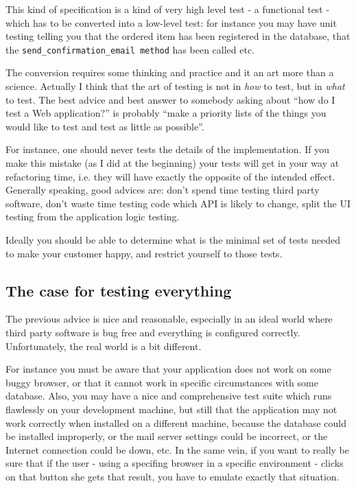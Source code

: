 \documentclass[10pt,a4paper,english]{article}
\begin{document}
This kind of specification is a kind of very high level test - a 
functional test - which has to be converted into a low-level test: 
for instance you may have unit testing telling you that the ordered 
item has been registered in the database, that the 
\texttt{send{\_}confirmation{\_}email method} has been called etc.

The conversion requires some thinking and practice and it an art more
than a science. Actually I think that the art of testing is not in \emph{how} 
to test, but in \emph{what} to test. The best advice and best answer to somebody 
asking about ``how do I  test a Web application?'' is probably ``make a priority 
lists of the things you would like to test and test as little as possible''.

For instance, one should never tests the details of the
implementation. If you make this mistake (as I did at the beginning) 
your tests will get in your way at refactoring time, i.e. they will
have exactly the opposite of the intended effect. Generally speaking,
good advices are: don't spend time testing third party software, don't 
waste time testing code which API is likely to change, split
the UI testing from the application logic testing.

Ideally you should be able to determine what is the minimal set 
of tests needed to make your customer happy, and restrict yourself to
those tests.



\hypertarget{the-case-for-testing-everything}{}
\subsection*{The case for testing everything}

The previous advice is nice and reasonable, especially in an ideal world 
where third party software is bug free and everything is configured correctly.
Unfortunately, the real world is a bit different.

For instance you must be aware that your application 
does not work on some buggy browser, or that it cannot work in specific
circumstances with some database. Also, you may have a nice and 
comprehensive test suite which runs flawlessly
on your development machine, but still
that the application may not work correctly when installed on a different 
machine, because the database could be installed improperly, or 
the mail server settings could be incorrect, or the Internet
connection could be down, etc. In the same vein, if you want
to really be sure that if the user - using a specifing browser in a
specific environment - clicks on that button she gets that result, 
you have to emulate exactly that situation.
\end{document}
